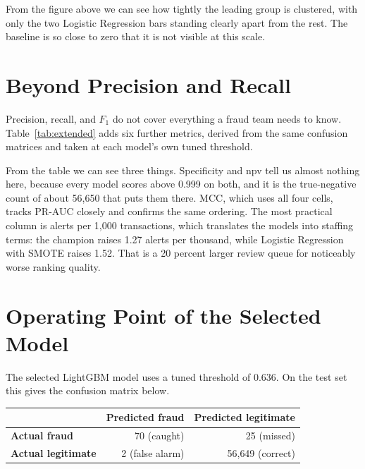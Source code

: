 From the figure above we can see how tightly the leading group is clustered, with only the
two Logistic Regression bars standing clearly apart from the rest. The baseline is so close
to zero that it is not visible at this scale.

\section{Beyond Precision and Recall}

Precision, recall, and $F_1$ do not cover everything a fraud team needs to know.
Table~\ref{tab:extended} adds six further metrics, derived from the same confusion matrices
and taken at each model's own tuned threshold.

\begin{table}[htbp]
    \centering
    \caption{Extended metrics.}
    \label{tab:extended}
    \small
    
\end{table}

From the table we can see three things. Specificity and \gls{npv} tell us almost nothing
here, because every
model scores above 0.999 on both, and it is the true-negative count of about 56{,}650 that
puts them there. MCC, which uses all four cells, tracks PR-AUC closely and confirms the
same ordering. The most practical column is alerts per 1{,}000 transactions, which
translates the models into staffing terms: the champion raises 1.27 alerts per thousand,
while Logistic Regression with SMOTE raises 1.52. That is a 20 percent larger review queue
for noticeably worse ranking quality.

\section{Operating Point of the Selected Model}

The selected LightGBM model uses a tuned threshold of 0.636. On the test set this gives the
confusion matrix below.

\begin{center}
\begin{tabular}{lrr}
\hline
& \textbf{Predicted fraud} & \textbf{Predicted legitimate} \\
\hline
\textbf{Actual fraud}       & 70 (caught)      & 25 (missed) \\
\textbf{Actual legitimate}  & 2 (false alarm)  & 56{,}649 (correct) \\
\hline
\end{tabular}
\end{center}

